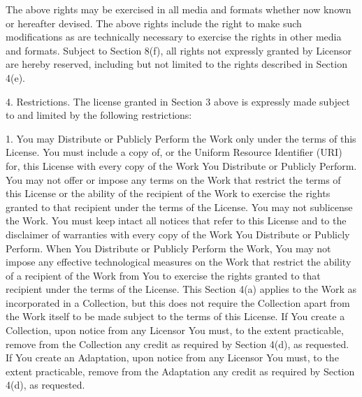 The above rights may be exercised in all media and formats whether
now known or hereafter devised. The above rights include the right
to make such modifications as are technically necessary to exercise
the rights in other media and formats. Subject to Section 8(f), all
rights not expressly granted by Licensor are hereby reserved,
including but not limited to the rights described in Section 4(e).

4. Restrictions. The license granted in Section 3 above is
expressly made subject to and limited by the following
restrictions:

1. You may Distribute or Publicly Perform the Work only under the
terms of this License. You must include a copy of, or the Uniform
Resource Identifier (URI) for, this License with every copy of the
Work You Distribute or Publicly Perform. You may not offer or
impose any terms on the Work that restrict the terms of this
License or the ability of the recipient of the Work to exercise the
rights granted to that recipient under the terms of the License.
You may not sublicense the Work. You must keep intact all notices
that refer to this License and to the disclaimer of warranties with
every copy of the Work You Distribute or Publicly Perform. When You
Distribute or Publicly Perform the Work, You may not impose any
effective technological measures on the Work that restrict the
ability of a recipient of the Work from You to exercise the rights
granted to that recipient under the terms of the License. This
Section 4(a) applies to the Work as incorporated in a Collection,
but this does not require the Collection apart from the Work itself
to be made subject to the terms of this License. If You create a
Collection, upon notice from any Licensor You must, to the extent
practicable, remove from the Collection any credit as required by
Section 4(d), as requested. If You create an Adaptation, upon
notice from any Licensor You must, to the extent practicable,
remove from the Adaptation any credit as required by Section 4(d),
as requested.

